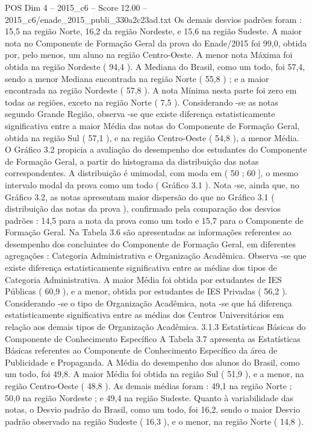\begin{textsample}{POS Dim 4 – 2015\_c6 – Score 12.00 – 2015\_c6/enade\_2015\_publi\_330a2c23ad.txt}
Os demais desvios padrões foram : 15,5 na região Norte, 16,2 da região Nordeste, e 15,6 na região Sudeste.
A maior nota no Componente de Formação Geral da prova do Enade/2015 foi 99,0, obtida por, pelo menos, um aluno na região Centro-Oeste.
A menor nota Máxima foi obtida na região Nordeste ( 94,4 ).
A Mediana do Brasil, como um todo, foi 57,4, sendo a menor Mediana encontrada na região Norte ( 55,8 ) ; e a maior encontrada na região Nordeste ( 57,8 ).
A nota Mínima nesta parte foi zero em todas as regiões, exceto na região Norte ( 7,5 ).
Considerando -se as notas segundo Grande Região, observa -se que existe diferença estatisticamente significativa entre a maior Média das notas do Componente de Formação Geral, obtida na região Sul ( 57,1 ), e na região Centro-Oeste ( 54,8 ), a menor Média.
O Gráfico 3.2 propicia a avaliação do desempenho dos estudantes do Componente de Formação Geral, a partir do histograma da distribuição das notas correspondentes.
A distribuição é unimodal, com moda em ( 50 ; 60 ], o mesmo intervalo modal da prova como um todo ( Gráfico 3.1 ).
Nota -se, ainda que, no Gráfico 3.2, as notas apresentam maior dispersão do que no Gráfico 3.1 ( distribuição das notas da prova ), confirmado pela comparação dos desvios padrões : 14,5 para a nota da prova como um todo e 15,7 para o Componente de Formação Geral.
Na Tabela 3.6 são apresentadas as informações referentes ao desempenho dos concluintes do Componente de Formação Geral, em diferentes agregações : Categoria Administrativa e Organização Acadêmica.
Observa -se que existe diferença estatisticamente significativa entre as médias dos tipos de Categoria Administrativa.
A maior Média foi obtida por estudantes de IES Públicas ( 60,9 ), e a menor, obtida por estudantes de IES Privadas ( 56,2 ).
Considerando -se o tipo de Organização Acadêmica, nota -se que há diferença estatisticamente significativa entre as médias dos Centros Universitários em relação aos demais tipos de Organização Acadêmica. 3.1.3 Estatísticas Básicas do Componente de Conhecimento Específico A Tabela 3.7 apresenta as Estatísticas Básicas referentes ao Componente de Conhecimento Específico da área de Publicidade e Propaganda.
A Média do desempenho dos alunos do Brasil, como um todo, foi 49,8.
A maior Média foi obtida na região Sul ( 51,9 ), e a menor, na região Centro-Oeste ( 48,8 ).
As demais médias foram : 49,1 na região Norte ; 50,0 na região Nordeste ; e 49,4 na região Sudeste.
Quanto à variabilidade das notas, o Desvio padrão do Brasil, como um todo, foi 16,2, sendo o maior Desvio padrão observado na região Sudeste ( 16,3 ), e o menor, na região Norte ( 14,8 ).

\end{textsample}

